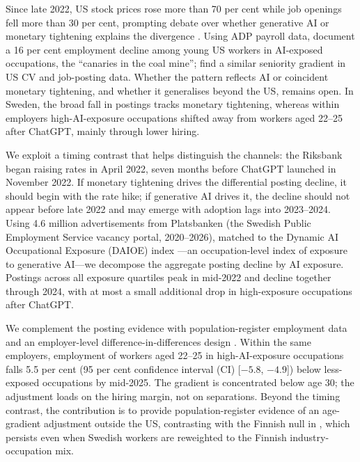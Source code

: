 \documentclass[preprint,12pt,authoryear]{elsarticle}
\begin{document}
Since late 2022, US stock prices rose more than 70 per cent while job openings fell more than 30 per cent, prompting debate over whether generative AI or monetary tightening explains the divergence \citep{thompson2025scary}. Using ADP payroll data, \citet{brynjolfsson2025canaries} document a 16 per cent employment decline among young US workers in AI-exposed occupations, the ``canaries in the coal mine''; \citet{hosseini2025seniority} find a similar seniority gradient in US CV and job-posting data. Whether the pattern reflects AI or coincident monetary tightening, and whether it generalises beyond the US, remains open. In Sweden, the broad fall in postings tracks monetary tightening, whereas within employers high-AI-exposure occupations shifted away from workers aged 22--25 after ChatGPT, mainly through lower hiring.

We exploit a timing contrast that helps distinguish the channels: the Riksbank began raising rates in April 2022, seven months before ChatGPT launched in November 2022. If monetary tightening drives the differential posting decline, it should begin with the rate hike; if generative AI drives it, the decline should not appear before late 2022 and may emerge with adoption lags into 2023--2024. Using 4.6 million advertisements from Platsbanken (the Swedish Public Employment Service vacancy portal, 2020--2026), matched to the Dynamic AI Occupational Exposure (DAIOE) index \citep{engberg2024daioe}---an occupation-level index of exposure to generative AI---we decompose the aggregate posting decline by AI exposure. Postings across all exposure quartiles peak in mid-2022 and decline together through 2024, with at most a small additional drop in high-exposure occupations after ChatGPT.

We complement the posting evidence with population-register employment data and an employer-level difference-in-differences design \citep{brynjolfsson2025canaries}. Within the same employers, employment of workers aged 22--25 in high-AI-exposure occupations falls 5.5 per cent (95 per cent confidence interval (CI) [$-5.8$, $-4.9$]) below less-exposed occupations by mid-2025. The gradient is concentrated below age 30; the adjustment loads on the hiring margin, not on separations. Beyond the timing contrast, the contribution is to provide population-register evidence of an age-gradient adjustment outside the US, contrasting with the Finnish null in \citet{kauhanen2026youth}, which persists even when Swedish workers are reweighted to the Finnish industry-occupation mix.
\end{document}
